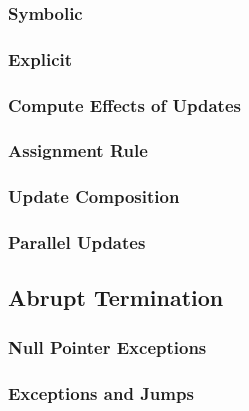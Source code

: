 \documentclass[a4paper, 11pt, accentcolor = tud3b]{tudreport}
\begin{document}
                \subsubsection{Symbolic} %

                \subsubsection{Explicit} %

                \subsubsection{Compute Effects of Updates} %

                \subsubsection{Assignment Rule} %

                \subsubsection{Update Composition} %

                \subsubsection{Parallel Updates} %

            \subsection{Abrupt Termination} %

                \subsubsection{Null Pointer Exceptions} %

                \subsubsection{Exceptions and Jumps} %
\end{document}
